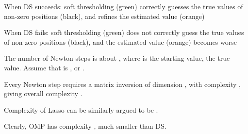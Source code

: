 {
\blank [big]

\I When DS succeeds: soft thresholding (green) correctly guesses the true values of non-zero positions (black), and refines the estimated value (orange)
}
{
\blank [big]

\I When DS fails: soft thresholding (green) does not correctly guess the true values of non-zero positions (black), and the estimated value (orange) becomes worse
}
{
\I The number of Newton steps is about , where  is the starting value,  the true value.
Assume that is , or .

\I Every Newton step requires a matrix inversion of dimension , with complexity , giving overall complexity .

\I Complexity of Lasso can be similarly argued to be .

\I Clearly, OMP has complexity , much smaller than DS.
}


